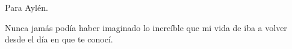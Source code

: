 
\newpage
\begin{center}
{\bf \Huge}
\end{center}
\vspace{1cm}
\setlength{\baselineskip}{0.8cm}

\begin{flushright}
	Para Aylén.
	
	Nunca jamás podía haber imaginado lo increíble que mi vida de iba a volver desde el día en que te conocí.
\end{flushright}